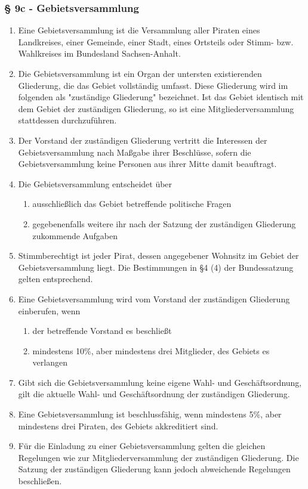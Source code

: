 \subsubsection{§ 9c - Gebietsversammlung}
\begin{enumerate}
\item Eine Gebietsversammlung ist die Versammlung aller Piraten eines Landkreises, einer Gemeinde, einer Stadt, eines Ortsteils oder Stimm- bzw. Wahlkreises im Bundesland Sachsen-Anhalt.

\item Die Gebietsversammlung ist ein Organ der untersten existierenden
Gliederung, die das Gebiet vollständig umfasst. Diese Gliederung wird im
folgenden als "zuständige Gliederung" bezeichnet. Ist das Gebiet identisch mit
dem Gebiet der zuständigen Gliederung, so ist eine Mitgliederversammlung
stattdessen durchzuführen.

\item Der Vorstand der zuständigen Gliederung vertritt die Interessen der
Gebietsversammlung nach Maßgabe ihrer Beschlüsse, sofern die Gebietsversammlung
keine Personen aus ihrer Mitte damit beauftragt.

\item Die Gebietsversammlung entscheidet über
\begin{enumerate}
\item ausschließlich das Gebiet betreffende politische Fragen

\item gegebenenfalls weitere ihr nach der Satzung der zuständigen Gliederung
zukommende Aufgaben
\end{enumerate}

\item Stimmberechtigt ist jeder Pirat, dessen angegebener Wohnsitz im Gebiet der
Gebietsversammlung liegt. Die Bestimmungen in §4 (4) der Bundessatzung gelten
entsprechend.

\item Eine Gebietsversammlung wird vom Vorstand der zuständigen Gliederung
einberufen, wenn
\begin{enumerate}
\item der betreffende Vorstand es beschließt

\item mindestens 10\%, aber mindestens drei Mitglieder, des Gebiets es verlangen
\end{enumerate}

\item Gibt sich die Gebietsversammlung keine eigene Wahl- und Geschäftsordnung,
gilt die aktuelle Wahl- und Geschäftsordnung der zuständigen Gliederung.

\item Eine Gebietsversammlung ist beschlussfähig, wenn mindestens 5\%, aber
mindestens drei Piraten, des Gebiets akkreditiert sind.

\item Für die Einladung zu einer Gebietsversammlung gelten die gleichen
Regelungen wie zur Mitgliederversammlung der zuständigen Gliederung. Die Satzung
der zuständigen Gliederung kann jedoch abweichende Regelungen beschließen.
\end{enumerate}

